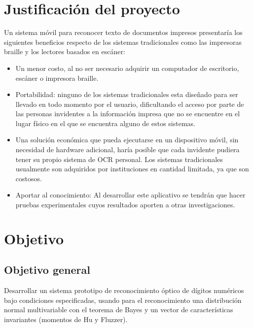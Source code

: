 \documentclass[a4paper, 11pt, oneside]{report}
\begin{document}
\section{Justificación del proyecto}

Un sistema móvil para reconocer texto de documentos impresos presentaría los siguientes beneficios respecto de los sistemas tradicionales como las impresoras braille y los lectores basados en escáner:

	\begin{itemize} 

	\item Un menor costo, al no ser necesario adquirir un computador de escritorio, escáner o impresora braille.

	\item Portabilidad: ninguno de los sistemas tradicionales esta diseñado para ser llevado en todo momento por el usuario, dificultando el acceso por parte de las personas invidentes a la información impresa que no se encuentre en el lugar físico en el que se encuentra alguno de estos sistemas.
	
	\item Una solución económica que pueda ejecutarse en un dispositivo móvil, sin necesidad de hardware adicional, haría posible que cada invidente pudiera tener su propio sistema de OCR personal. Los sistemas tradicionales usualmente son adquiridos por instituciones en cantidad limitada, ya que son costosos.

	\item Aportar al conocimiento: Al desarrollar este aplicativo se tendrán que hacer pruebas experimentales cuyos resultados aporten a otras investigaciones.

	\end{itemize}
	
\section{Objetivo}
\label{sect:objective}
	
\subsection{Objetivo general}

Desarrollar un sistema prototipo de reconocimiento óptico de dígitos numéricos bajo condiciones especificadas, usando para el reconocimiento una distribución normal multivariable con el teorema de Bayes y un vector de características invariantes (momentos de Hu y Fluzzer).
\end{document}
